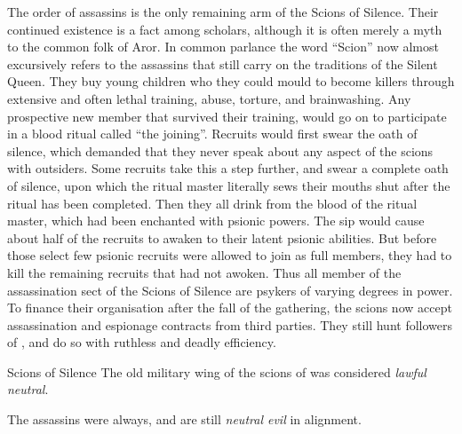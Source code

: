 The order of assassins is the only remaining arm of the Scions of Silence.
Their continued existence is a fact among scholars, although it is
often merely a myth to the common folk of Aror. In common parlance the word
``Scion'' now almost excursively refers to the assassins that still carry on
the traditions of the Silent Queen. They buy young children who they could
mould to become killers through extensive and often lethal training, abuse,
torture, and brainwashing. Any prospective new member that survived their
training, would go on to participate in a blood ritual called ``the joining''.
Recruits would first swear the oath of silence, which demanded that they never
speak about any aspect of the scions with outsiders. Some recruits take this a
step further, and swear a complete oath of silence, upon which the ritual
master literally sews their mouths shut after the ritual has been
completed. Then they all drink from the blood of the ritual master, which had
been enchanted with psionic powers. The sip would cause about half of the
recruits to awaken to their latent psionic abilities. But before those select
few psionic recruits were allowed to join as full members, they had to kill
the remaining recruits that had not awoken. Thus all member of the
assassination sect of the Scions of Silence are psykers of varying degrees in
power. To finance their organisation after the fall of the gathering, the
scions now accept assassination and espionage contracts from third parties.
They still hunt followers of , and do so with ruthless and
deadly efficiency.


\begin{35e}{Scions of Silence}
  The old military wing of the scions of was considered \emph{lawful neutral}.

  The assassins were always, and are still \emph{neutral evil} in alignment.
\end{35e}
